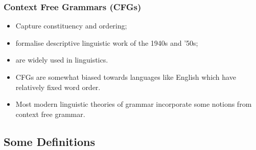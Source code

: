 %


\begin{frame}[fragile]
\frametitle{Context Free Grammars (CFGs)}

\begin{itemize}
\item Capture constituency and ordering;
\item formalise descriptive linguistic work of the 1940s and '50s;
\item are widely used in linguistics.
\end{itemize}

\begin{itemize}

\item CFGs are somewhat biased towards languages like English which have
relatively fixed word order.

\item Most modern linguistic theories of grammar incorporate some notions from
context free grammar.
\end{itemize}


\end{frame}

%

\subsection{Some Definitions}

